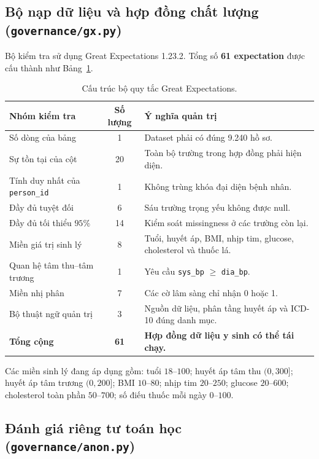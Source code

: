 \documentclass[11pt,a4paper]{article}
\begin{document}
\subsection{Bộ nạp dữ liệu và hợp đồng chất lượng (\texttt{governance/gx.py})}

Bộ kiểm tra sử dụng Great Expectations 1.23.2. Tổng số \textbf{61 expectation} được cấu thành như Bảng~\ref{tab:expectations}.

\begin{table}[ht]
\centering
\small
\begin{tabularx}{\textwidth}{>{\raggedright\arraybackslash}X c >{\raggedright\arraybackslash}X}
\toprule
\textbf{Nhóm kiểm tra} & \textbf{Số lượng} & \textbf{Ý nghĩa quản trị} \\
\midrule
Số dòng của bảng & 1 & Dataset phải có đúng 9.240 hồ sơ. \\
Sự tồn tại của cột & 20 & Toàn bộ trường trong hợp đồng phải hiện diện. \\
Tính duy nhất của \texttt{person\_id} & 1 & Không trùng khóa đại diện bệnh nhân. \\
Đầy đủ tuyệt đối & 6 & Sáu trường trọng yếu không được null. \\
Đầy đủ tối thiểu $95\%$ & 14 & Kiểm soát missingness ở các trường còn lại. \\
Miền giá trị sinh lý & 8 & Tuổi, huyết áp, BMI, nhịp tim, glucose, cholesterol và thuốc lá. \\
Quan hệ tâm thu--tâm trương & 1 & Yêu cầu \texttt{sys\_bp} $\geq$ \texttt{dia\_bp}. \\
Miền nhị phân & 7 & Các cờ lâm sàng chỉ nhận 0 hoặc 1. \\
Bộ thuật ngữ quản trị & 3 & Nguồn dữ liệu, phân tầng huyết áp và ICD-10 đúng danh mục. \\
\midrule
\textbf{Tổng cộng} & \textbf{61} & \textbf{Hợp đồng dữ liệu y sinh có thể tái chạy.} \\
\bottomrule
\end{tabularx}
\caption{Cấu trúc bộ quy tắc Great Expectations.}
\label{tab:expectations}
\end{table}

Các miền sinh lý đang áp dụng gồm: tuổi $18$--$100$; huyết áp tâm thu $(0,300]$; huyết áp tâm trương $(0,200]$; BMI $10$--$80$; nhịp tim $20$--$250$; glucose $20$--$600$; cholesterol toàn phần $50$--$700$; số điếu thuốc mỗi ngày $0$--$100$.

\subsection{Đánh giá riêng tư toán học (\texttt{governance/anon.py})}
\end{document}
